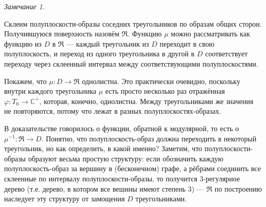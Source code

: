 \documentclass[12pt]{article}
\renewcommand{\C}{\mathbb{C}}
\theoremstyle{thmnote}
\theoremstyle{remark}
\newtheorem*{remark}{Замечание}
\theoremstyle{defnote}
\begin{document}
\begin{remark}
\begin{center}
    \end{center}
    
    Склеим полуплоскости-образы соседних треугольников по образам общих сторон. Получившуюся поверхность назовём $\mathfrak{R}$. Функцию $\mu$ можно рассматривать как функцию из $D$ в $\mathfrak{R}$ --- каждый треугольник из $D$ переходит в свою полуплоскость, и переход из одного треугольника в другой в $D$ соответствует переходу через склеенный интервал между соответствующими полуплоскостями.
         

    Покажем, что $\mu: D \to \mathfrak{R}$ однолистна. Это практически очевидно, поскольку внутри каждого треугольника $\mu$ есть просто несколько раз отражённая $\varphi: T_0 \to \C^+$, которая, конечно, однолистна. Между треугольниками же значения не повторяются, потому что лежат в разных полуплоскостях-образах.

    В доказательстве говорилось о функции, обратной к модулярной, то есть о $\mu^{-1}: \mathfrak{R} \to D$. Понятно, что полуплоскость-образ должна переходить в некоторый треугольник, но как определить, в какой именно? Заметим, что полуплоскости-образы образуют весьма простую структуру: если обозначить каждую полуплоскость-образ за вершину в (бесконечном) графе, а рёбрами соединить все склеенные по интервалу полуплоскости-образы, то получится 3-регулярное дерево (т.е. дерево, в котором все вешины имеют степень 3) --- $\mathfrak{R}$ по построению наследует эту структуру от замощения $D$ треугольниками.
    \begin{center}
\end{center}
\end{remark}
\end{document}

